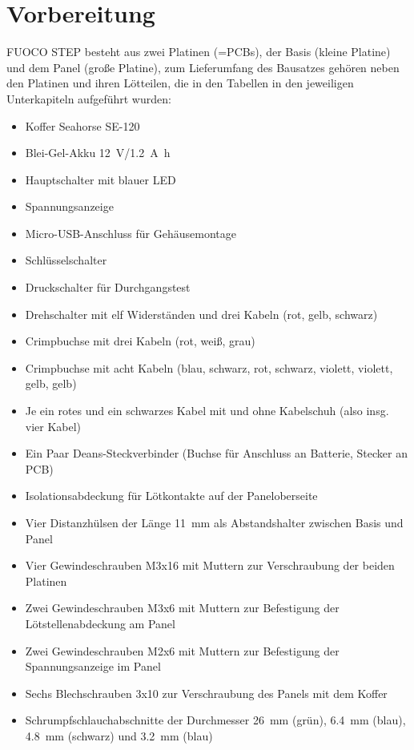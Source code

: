 \documentclass[paper=a4, open=any]{scrbook}
\begin{document}
	\chapter{Vorbereitung}
		FUOCO STEP besteht aus zwei Platinen (=PCBs), der Basis (kleine Platine) und dem Panel (große Platine), zum Lieferumfang des Bausatzes gehören neben den Platinen und ihren Lötteilen, die in den Tabellen in den jeweiligen Unterkapiteln aufgeführt wurden:
		\begin{itemize}
			\item Koffer Seahorse SE-120
			\item Blei-Gel-Akku \SI{12}{\volt}/\SI{1,2}{\ampere\hour}
			\item Hauptschalter mit blauer LED
			\item Spannungsanzeige
			\item Micro-USB-Anschluss für Gehäusemontage
			\item Schlüsselschalter
			\item Druckschalter für Durchgangstest
			\item Drehschalter mit elf Widerständen und drei Kabeln (rot, gelb, schwarz)
			\item Crimpbuchse mit drei Kabeln (rot, weiß, grau)
			\item Crimpbuchse mit acht Kabeln (blau, schwarz, rot, schwarz, violett, violett, gelb, gelb)
			\item Je ein rotes und ein schwarzes Kabel mit und ohne Kabelschuh (also insg. vier Kabel)
			\item Ein Paar Deans-Steckverbinder (Buchse für Anschluss an Batterie, Stecker an PCB)
			\item Isolationsabdeckung für Lötkontakte auf der Paneloberseite
			\item Vier Distanzhülsen der Länge \SI{11}{\milli\metre} als Abstandshalter zwischen Basis und Panel
			\item Vier Gewindeschrauben M3x16 mit Muttern zur Verschraubung der beiden Platinen
			\item Zwei Gewindeschrauben M3x6 mit Muttern zur Befestigung der Lötstellenabdeckung am Panel
			\item Zwei Gewindeschrauben M2x6 mit Muttern zur Befestigung der Spannungsanzeige im Panel
			\item Sechs Blechschrauben 3x10 zur Verschraubung des Panels mit dem Koffer
			\item Schrumpfschlauchabschnitte der Durchmesser \SI{26}{\milli\metre} (grün), \SI{6,4}{\milli\metre} (blau), \SI{4,8}{\milli\metre} (schwarz) und \SI{3,2}{\milli\metre} (blau)	
		\end{itemize}
\end{document}

